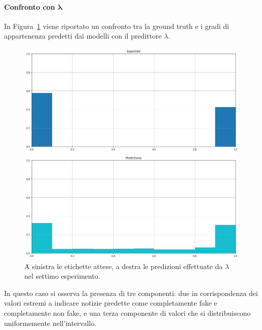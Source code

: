 \documentclass[12pt]{report}
\theoremstyle{definition}
\begin{document}
\paragraph{Confronto con $\bm{\lambda}$}
In Figura~\ref{prediction_exp7} viene riportato un confronto tra la ground truth e i gradi di appartenenza predetti dai modelli con il predittore $\lambda$.
\begin{figure}
\centering
    \begin{minipage}{0.48\textwidth}
        \includegraphics[width=\linewidth]{images/experiment_kaggle/expected_memberships.png}
    \end{minipage}
    \begin{minipage}{0.48\textwidth}
        \includegraphics[width=\linewidth]{images/experiment_kaggle/prediction_memberships.png}
    \end{minipage}
    \caption{A sinistra le etichette attese, a destra le predizioni effettuate da $\lambda$ nel settimo esperimento.}
    \label{prediction_exp7}
\end{figure} 
In questo caso si osserva la presenza di tre componenti: due in corrispondenza dei valori estremi a indicare notizie predette come completamente fake e completamente non fake, e una terza componente di valori che si distribuiscono uniformemente nell'intervallo.
\end{document}
